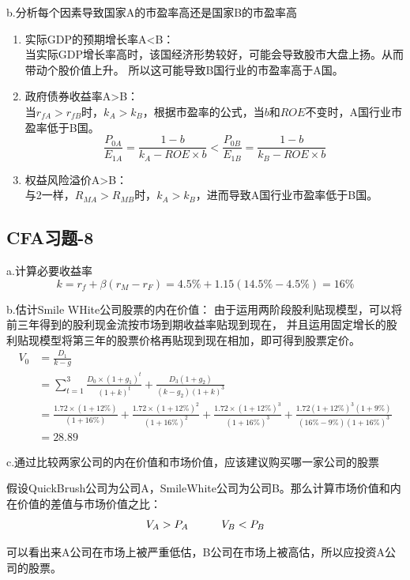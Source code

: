 \documentclass{article}
\begin{document}
b.分析每个因素导致国家A的市盈率高还是国家B的市盈率高
\begin{enumerate}
    \item 实际GDP的预期增长率A<B：\\
    当实际GDP增长率高时，该国经济形势较好，可能会导致股市大盘上扬。从而带动个股价值上升。
    所以这可能导致B国行业的市盈率高于A国。
    \item 政府债券收益率A>B：\\
    当$r_{fA}>r_{fB}$时，$k_A>k_B$，根据市盈率的公式，当$b$和$ROE$不变时，A国行业市盈率低于B国。
    \[\frac{P_{0A}}{E_{1A}}=\frac{1-b}{k_A-ROE\times b}<\frac{P_{0B}}{E_{1B}}=\frac{1-b}{k_B-ROE\times b}\]
    \item 权益风险溢价A>B：\\
    与2一样，$R_{MA}>R_{MB}$时，$k_A>k_B$，进而导致A国行业市盈率低于B国。
\end{enumerate}
\subsection*{CFA习题-8}
a.计算必要收益率
\[k=r_f+\beta (r_M-r_F)=4.5\%+1.15(14.5\%-4.5\%)=16\%\]

b.估计Smile WHite公司股票的内在价值：
由于运用两阶段股利贴现模型，可以将前三年得到的股利现金流按市场到期收益率贴现到现在，
并且运用固定增长的股利贴现模型将第三年的股票价格再贴现到现在相加，即可得到股票定价。
\begin{align}
    V_0&=\frac{D_1}{k-g}\\
    &=\sum_{t = 1}^{3} \frac{D_0 \times (1+g_1)^t}{(1+k)^t}+\frac{D_3(1+g_2)}{(k-g_2)(1+k)^3}\\
    &=\frac{1.72\times (1+12\%)}{(1+16\%)}
    +\frac{1.72\times (1+12\%)^2}{(1+16\%)^2}
    +\frac{1.72\times (1+12\%)^3}{(1+16\%)^3}
    +\frac{1.72(1+12\%)^3  (1+9\%)}{(16\%-9\%)(1+16\%)^3}\\
    &=28.89
\end{align}

c.通过比较两家公司的内在价值和市场价值，应该建议购买哪一家公司的股票

假设QuickBrush公司为公司A，SmileWhite公司为公司B。那么计算市场价值和内在价值的差值与市场价值之比：
\[V_A>P_A \hspace*{30pt} V_B<P_B \]

可以看出来A公司在市场上被严重低估，B公司在市场上被高估，所以应投资A公司的股票。
\end{document}
